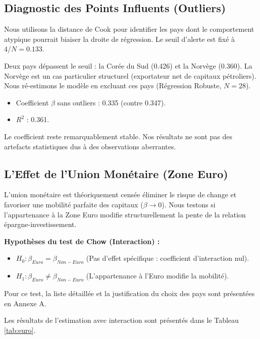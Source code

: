 \documentclass[12pt, a4paper]{article}
\begin{document}
\subsection{Diagnostic des Points Influents (Outliers)}

Nous utilisons la distance de Cook pour identifier les pays dont le comportement atypique pourrait biaiser la droite de régression. Le seuil d'alerte est fixé à $4/N = 0.133$.


Deux pays dépassent le seuil : la Corée du Sud (0.426) et la Norvège (0.360). La Norvège est un cas particulier structurel (exportateur net de capitaux pétroliers).
Nous ré-estimons le modèle en excluant ces pays (Régression Robuste, $N=28$).
\begin{itemize}
    \item Coefficient $\beta$ sans outliers : 0.335 (contre 0.347).
    \item $R^2$ : 0.361.
\end{itemize}
Le coefficient reste remarquablement stable. Nos résultats ne sont pas des artefacts statistiques dus à des observations aberrantes.


\subsection{L'Effet de l'Union Monétaire (Zone Euro)}

L'union monétaire est théoriquement censée éliminer le risque de change et favoriser une mobilité parfaite des capitaux ($\beta \to 0$). Nous testons si l'appartenance à la Zone Euro modifie structurellement la pente de la relation épargne-investissement.

\textbf{Hypothèses du test de Chow (Interaction) :}
\begin{itemize}
    \item $H_0 : \beta_{Euro} = \beta_{Non-Euro}$ (Pas d'effet spécifique : coefficient d'interaction nul).
    \item $H_1 : \beta_{Euro} \neq \beta_{Non-Euro}$ (L'appartenance à l'Euro modifie la mobilité).
\end{itemize}

Pour ce test, la liste détaillée et la justification du choix des pays sont présentées en Annexe A.

Les résultats de l'estimation avec interaction sont présentés dans le Tableau \ref{tab:euro}.
\end{document}

